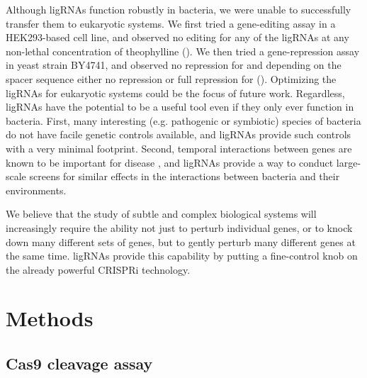 \documentclass[10pt,oneside]{article}
\begin{document}
Although ligRNAs function robustly in bacteria, we were unable to successfully transfer them to eukaryotic systems.  We first tried a gene-editing assay in a HEK293-based cell line, and observed no editing for any of the ligRNAs at any non-lethal concentration of theophylline ().  We then tried a gene-repression assay in yeast strain BY4741, and observed no repression for \ligrnaF{} and depending on the spacer sequence either no repression or full repression for \ligrnaB{} ().  Optimizing the ligRNAs for eukaryotic systems could be the focus of future work.  Regardless, ligRNAs have the potential to be a useful tool even if they only ever function in bacteria.  First, many interesting (e.g. pathogenic or symbiotic) species of bacteria do not have facile genetic controls available, and ligRNAs provide such controls with a very minimal footprint.  Second, temporal interactions between genes are known to be important for disease \autocite{MISSING-REF}, and ligRNAs provide a way to conduct large-scale screens for similar effects in the interactions between bacteria and their environments.
% 
% 


We believe that the study of subtle and complex biological systems will increasingly require the ability not just to perturb individual genes, or to knock down many different sets of genes, but to gently perturb many different genes at the same time.  ligRNAs provide this capability by putting a fine-control knob on the already powerful CRISPRi technology.

\section{Methods}

\subsection{\Invitro{} Cas9 cleavage assay}
\end{document}
